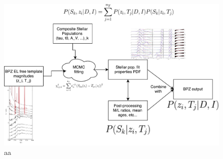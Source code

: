 \documentclass[9pt]{memoir}
\begin{document}
\begin{figure}
\begin{adjustwidth*}{1in}{0pt}
\centering
\includegraphics[width=.8\textwidth]{figures/mass_pdf.pdf}
\end{adjustwidth*}
\caption{aa}
\label{fig:algorithm}
\end{figure}
\end{document}
